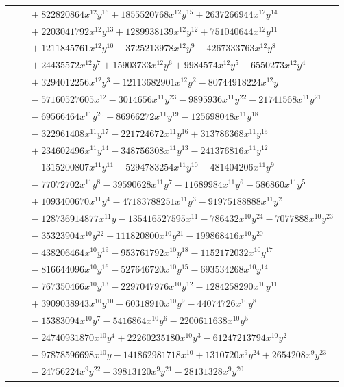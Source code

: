 \documentclass[11pt]{article}
\begin{document}
\begin{longtable}{@{}ll@{}}
 & $\quad +822820864x^{12}y^{16}+1855520768x^{12}y^{15}+2637266944x^{12}y^{14}$\\
 & $\quad +2203041792x^{12}y^{13}+1289938139x^{12}y^{12}+751040644x^{12}y^{11}$\\
 & $\quad +1211845761x^{12}y^{10}-3725213978x^{12}y^{9}-4267333763x^{12}y^{8}$\\
 & $\quad +24435572x^{12}y^{7}+15903733x^{12}y^{6}+9984574x^{12}y^{5}+6550273x^{12}y^{4}$\\
 & $\quad +3294012256x^{12}y^{3}-12113682901x^{12}y^{2}-80744918224x^{12}y$\\
 & $\quad -57160527605x^{12}-3014656x^{11}y^{23}-9895936x^{11}y^{22}-21741568x^{11}y^{21}$\\
 & $\quad -69566464x^{11}y^{20}-86966272x^{11}y^{19}-125698048x^{11}y^{18}$\\
 & $\quad -322961408x^{11}y^{17}-221724672x^{11}y^{16}+313786368x^{11}y^{15}$\\
 & $\quad +234602496x^{11}y^{14}-348756308x^{11}y^{13}-241376816x^{11}y^{12}$\\
 & $\quad -1315200807x^{11}y^{11}-5294783254x^{11}y^{10}-481404206x^{11}y^{9}$\\
 & $\quad -77072702x^{11}y^{8}-39590628x^{11}y^{7}-11689984x^{11}y^{6}-586860x^{11}y^{5}$\\
 & $\quad +1093400670x^{11}y^{4}-47183788251x^{11}y^{3}-91975188888x^{11}y^{2}$\\
 & $\quad -128736914877x^{11}y-135416527595x^{11}-786432x^{10}y^{24}-7077888x^{10}y^{23}$\\
 & $\quad -35323904x^{10}y^{22}-111820800x^{10}y^{21}-199868416x^{10}y^{20}$\\
 & $\quad -438206464x^{10}y^{19}-953761792x^{10}y^{18}-1152172032x^{10}y^{17}$\\
 & $\quad -816644096x^{10}y^{16}-527646720x^{10}y^{15}-693534268x^{10}y^{14}$\\
 & $\quad -767350466x^{10}y^{13}-2297047976x^{10}y^{12}-1284258290x^{10}y^{11}$\\
 & $\quad +3909038943x^{10}y^{10}-60318910x^{10}y^{9}-44074726x^{10}y^{8}$\\
 & $\quad -15383094x^{10}y^{7}-5416864x^{10}y^{6}-2200611638x^{10}y^{5}$\\
 & $\quad -24740931870x^{10}y^{4}+22260235180x^{10}y^{3}-61247213794x^{10}y^{2}$\\
 & $\quad -97878596698x^{10}y-141862981718x^{10}+1310720x^{9}y^{24}+2654208x^{9}y^{23}$\\
 & $\quad -24756224x^{9}y^{22}-39813120x^{9}y^{21}-28131328x^{9}y^{20}$\\

\end{longtable}
\end{document}
